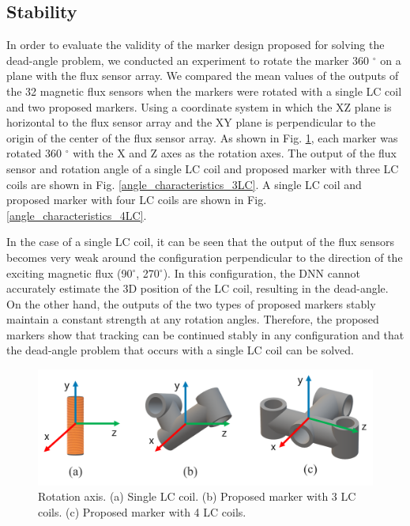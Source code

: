 \documentclass[journal,twoside,web]{ieeecolor}
\begin{document}
\subsection{Stability}
In order to evaluate the validity of the marker design proposed for solving the dead-angle problem, we conducted an experiment to rotate the marker 360 $^\circ$ on a plane with the flux sensor array. We compared the mean values of the outputs of the 32 magnetic flux sensors when the markers were rotated with a single LC coil and two proposed markers. Using a coordinate system in which the XZ plane is horizontal to the flux sensor array and the XY plane is perpendicular to the origin of the center of the flux sensor array. As shown in Fig. \ref{rotation-define}, each marker was rotated 360 $^\circ$ with the X and Z axes as the rotation axes. The output of the flux sensor and rotation angle of a single LC coil and proposed marker with three LC coils are shown in Fig. \ref{angle_characteristics_3LC}. A single LC coil and proposed marker with four LC coils are shown in Fig. \ref{angle_characteristics_4LC}.

In the case of a single LC coil, it can be seen that the output of the flux sensors becomes very weak around the configuration perpendicular to the direction of the exciting magnetic flux (90$^\circ$, 270$^\circ$). In this configuration, the DNN cannot accurately estimate the 3D position of the LC coil, resulting in the dead-angle. On the other hand, the outputs of the two types of proposed markers stably maintain a constant strength at any rotation angles. Therefore, the proposed markers show that tracking can be continued stably in any configuration and that the dead-angle problem that occurs with a single LC coil can be solved.

\begin{figure}[!t]
    \centerline{\includegraphics[width=\columnwidth]{figure/rotation-define3.png}}
    \caption{Rotation axis. (a) Single LC coil. (b) Proposed marker with 3 LC coils. (c) Proposed marker with 4 LC coils.}
    \label{rotation-define}
\end{figure}
\end{document}
